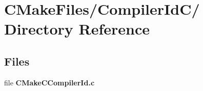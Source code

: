 \section{\-C\-Make\-Files/\-Compiler\-Id\-C/ \-Directory \-Reference}
\label{dir_f2f4a294280465aedbd31c2ad7b5bd00}
\subsection*{\-Files}
\begin{DoxyCompactItemize}
\item 
file {\bf \-C\-Make\-C\-Compiler\-Id.\-c}
\end{DoxyCompactItemize}
